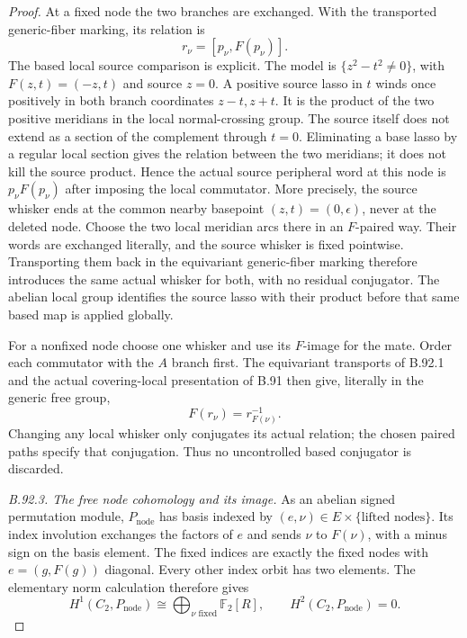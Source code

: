 \begin{proof}
At a fixed node the two branches are exchanged. With the transported
generic-fiber marking, its relation is
\[
                         r_\nu=[p_\nu,F(p_\nu)].
\]
The based local source comparison is explicit. The model is
$\{z^2-t^2\ne0\}$, with $F(z,t)=(-z,t)$ and source $z=0$.
A positive source lasso in $t$ winds once positively in both branch
coordinates $z-t,z+t$. It is the product of the two positive
meridians in the local normal-crossing group. The source itself
does not extend as a section of the complement through $t=0$.
Eliminating a base lasso by a regular local section gives the
relation between the two meridians; it does not kill the source
product. Hence the actual source peripheral word at this node is
$p_\nu F(p_\nu)$ after imposing the local commutator.
More precisely, the source whisker ends at the common nearby
basepoint $(z,t)=(0,\epsilon)$, never at the deleted node. Choose
the two local meridian arcs there in an $F$-paired way. Their
words are exchanged literally, and the source whisker is fixed
pointwise. Transporting them back in the equivariant generic-fiber
marking therefore introduces the same actual whisker for both,
with no residual conjugator. The abelian local group identifies
the source lasso with their product before that same based map
is applied globally.

For a nonfixed node choose one whisker and use its $F$-image for
the mate. Order each commutator with the $A$ branch first. The
equivariant transports of B.92.1 and the actual covering-local
presentation of B.91 then give, literally in the generic free group,
\[
                         F(r_\nu)=r_{F(\nu)}^{-1}.
\]
Changing any local whisker only conjugates its actual relation;
the chosen paired paths specify that conjugation. Thus no
uncontrolled based conjugator is discarded.

\emph{B.92.3. The free node cohomology and its image.}
As an abelian signed permutation module, $P_{\mathrm{node}}$ has
basis indexed by $(e,\nu)\in E\times\{\text{lifted nodes}\}$.
Its index involution exchanges the factors of $e$ and sends
$\nu$ to $F(\nu)$, with a minus sign on the basis element.
The fixed indices are exactly the fixed nodes with
$e=(g,F(g))$ diagonal. Every other index orbit has two elements.
The elementary norm calculation therefore gives
\begin{equation}\label{eq:B92-node-Tate}
 H^1(C_2,P_{\mathrm{node}})
       \cong\bigoplus_{\nu\text{ fixed}}\mathbb F_2[R],
 \qquad H^2(C_2,P_{\mathrm{node}})=0.
\end{equation}


\end{proof}
